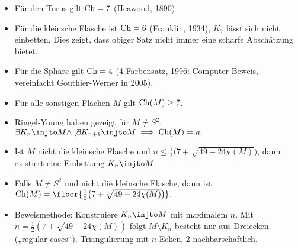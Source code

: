 \begin{ex}
    \begin{itemize}
        \item
            Für den Torus gilt $\operatorname { Ch } = 7$ (Heawood, 1890)
        \item
            Für die kleinsche Flasche ist $\operatorname { Ch } = 6$ (Franklin, 1934), $K_7$ lässt sich nicht einbetten.
            Dies zeigt, dass obiger Satz nicht immer eine scharfe Abschätzung bietet.
        \item
            Für die Sphäre gilt $\operatorname { Ch } = 4$ (4-Farbensatz, 1996: Computer-Beweis, vereinfacht Gouthier-Werner in 2005).
        \item
            Für alle sonstigen Flächen $M$ gilt $\operatorname { Ch }(M) \ge 7$.
    \end{itemize}
\end{ex}

\begin{nt}
    \begin{itemize}
        \item
            Ringel-Young haben gezeigt für $M \neq S^2$:
            \begin{math}
                \exists K_n \injto M \land \not\exists K_{n+1} \injto M
                \implies
                \Ch(M) = n.
            \end{math}
        \item
            Ist $M$ nicht die kleinsche Flasche und $n \le \frac{1}{2} \big(7 + \sqrt{49 - 24\chi(M)}\big)$, dann existiert eine Einbettung $K_n \injto M$.
        \item
            Falls $M \neq S^2$ und nicht die kleinsche Flasche, dann ist
            \begin{math}
                \Ch(M) = \floor{\frac{1}{2}\big(7 + \sqrt{49 - 24\chi(M)}\big)}.
            \end{math}
        \item
            Beweismethode:
            Konstruiere $K_n \injto M$ mit maximalem $n$.
            Mit $n = \frac{1}{2}(7 + \sqrt{49 - 24\chi(M)})$ folgt $M \setminus K_n$ besteht nur aus Dreiecken.
            („regular cases“).
            Triangulierung mit $n$ Ecken, 2-nachbarschaftlich.
    \end{itemize}
\end{nt}
